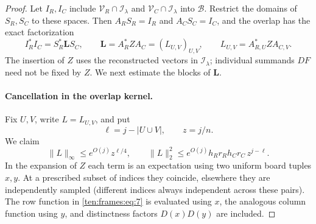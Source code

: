 \begin{proof}
Let $I_R,I_C$ include $\mathcal V_R\cap\mathcal I_\lambda$ and $\mathcal V_C\cap\mathcal I_\lambda$ into $\mathcal B$. Restrict the domains of $S_R,S_C$ to these spaces. Then $A_RS_R=I_R$ and $A_CS_C=I_C$, and the overlap has the exact factorization
\begin{equation}\label{eq:frame-factorization}
 I_R^*I_C=S_R^*\mathbf L S_C,\qquad
 \mathbf L=A_R^*ZA_C=(L_{U,V})_{U,V},\qquad
 L_{U,V}=A_{R,U}^*ZA_{C,V}.
\end{equation}
The insertion of $Z$ uses the reconstructed vectors in $\mathcal I_\lambda$; individual summands $DF$ need not be fixed by $Z$. We next estimate the blocks of $\mathbf L$.

\paragraph{Cancellation in the overlap kernel.}
\label{ten:frames:part:74}
Fix $U,V$, write $L=L_{U,V}$, and put
\[
 \ell=j-|U\cup V|,\qquad z=j/n.
\]
We claim
\begin{equation}
 \|L\|_\infty\le e^{O(j)} z^{\ell/4},\qquad
 \|L\|_2^2\le e^{O(j)} h_R r_R h_C r_C\, z^{j-\ell}.
 \label{ten:frames:eq:8}
\end{equation}
In the expansion of \(Z\) each term is an expectation using two uniform board tuples \(x,y\). At a prescribed subset of indices they coincide, elsewhere they are independently sampled (different indices always independent across these pairs). The row function in \eqref{ten:frames:eq:7} is evaluated using \(x\), the analogous column function using \(y\), and distinctness factors \(D(x)D(y)\) are included.


\end{proof}
